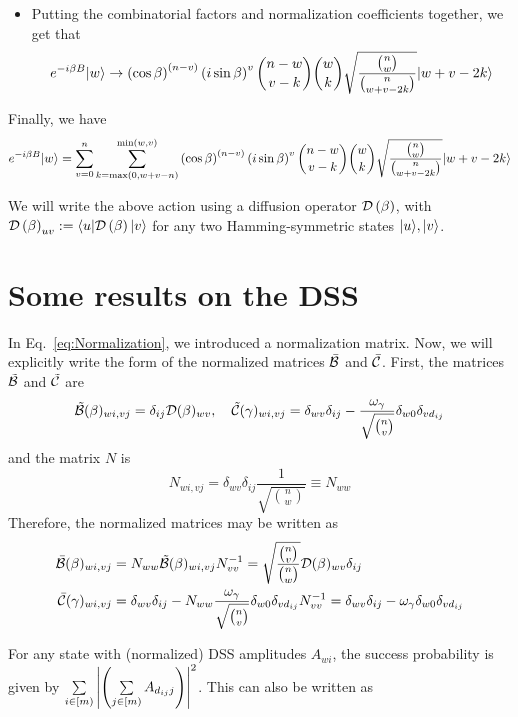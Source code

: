\documentclass[11pt]{article}
\begin{document}
\begin{appendices}
\begin{itemize}
\item Putting the combinatorial factors and normalization coefficients together, we get that 
$$
e^{-i\beta B}|w\rangle \rightarrow \left(\cos\beta\right)^{\left(n-v\right)}\left(i\sin\beta\right)^{v}\binom{n-w}{v-k}\binom{w}{k}\sqrt{\frac{\binom{n}{w}}{\binom{n}{w+v-2k}}}|w+v-2k\rangle
$$
\end{itemize}
Finally, we have 
$$
e^{-i\beta B}|w\rangle = \sum\limits_{v=0}^{n}\sum\limits_{k=\max\left(0,w+v-n\right)}^{\min\left(w,v\right)}\left(\cos\beta\right)^{\left(n-v\right)}\left(i\sin\beta\right)^{v}\binom{n-w}{v-k}\binom{w}{k}\sqrt{\frac{\binom{n}{w}}{\binom{n}{w+v-2k}}}|w+v-2k\rangle
$$


We will write the above action using a diffusion operator $\mathcal{D}\left(\beta\right)$, with $\mathcal{D}\left(\beta\right)_{uv} := \langle u |\mathcal{D}\left(\beta\right)|v\rangle$ for any two Hamming-symmetric states $|u\rangle,|v\rangle$.

\section{Some results on the DSS}
In Eq.~\ref{eq:Normalization}, we introduced a normalization matrix. Now, we will explicitly write the form of the normalized matrices $\bar{\mathcal{B}}$ and $\bar{\mathcal{C}}$. First, the matrices $\tilde{\mathcal{B}}$ and $\tilde{\mathcal{C}}$ are
\begin{equation}
  \tilde{\mathcal{B}}(\beta)_{wi,vj} = \delta_{ij}\mathcal{D}(\beta)_{wv}, \ \ \  \tilde{\mathcal{C}}(\gamma)_{wi,vj} = \delta_{wv}\delta_{ij} - \frac{\omega_\gamma}{\sqrt{\binom{n}{v}}}\delta_{w0}\delta_{vd_{ij}}  
\end{equation}
and the matrix $N$ is
  \begin{equation}
    N_{wi, vj} = \delta_{wv}\delta_{ij}\frac{1}{\sqrt{\binom n w}} \equiv N_{ww}
  \end{equation}
Therefore, the normalized matrices may be written as
\begin{align}
  \bar{\mathcal{B}}(\beta)_{wi,vj} &= N_{ww}\tilde{\mathcal{B}}(\beta)_{wi,vj} N_{vv}^{-1} = \sqrt{\frac{\binom{n}{v}}{\binom{n}{w}}}\mathcal{D}(\beta)_{wv}\delta_{ij}\\
   \bar{\mathcal{C}}(\gamma)_{wi,vj} &= \delta_{wv}\delta_{ij} - N_{ww} \frac{\omega_\gamma}{\sqrt{\binom{n}{v}}}\delta_{w0}\delta_{vd_{ij}} N_{vv}^{-1} = \delta_{wv}\delta_{ij} - \omega_\gamma\delta_{w0}\delta_{vd_{ij}}
\end{align}


For any state with (normalized) DSS amplitudes $A_{wi}$, the success probability is given by $\sum\limits_{i\in [m)}^{}\left|\left(\sum\limits_{j\in [m)}^{}A_{d_{ij} j}\right)\right|^2$. This can also be written as
\end{appendices}



\end{document}
